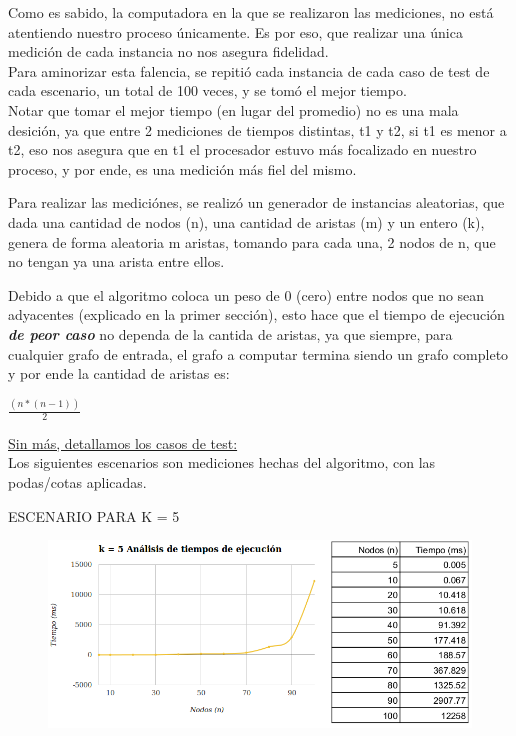 \documentclass[10pt,a4paper]{article}
\begin{document}
Como es sabido, la computadora en la que se realizaron las mediciones, no está atentiendo nuestro proceso únicamente. Es por eso, que realizar una única medición de cada instancia no nos asegura fidelidad.\\
\indent Para aminorizar esta falencia, se repitió cada instancia de cada caso de test de cada escenario, un total de 100 veces, y se tomó el mejor tiempo.\\
Notar que tomar el mejor tiempo (en lugar del promedio) no es una mala desición, ya que entre 2 mediciones de tiempos distintas, t1 y t2, si t1 es menor a t2, eso nos asegura que en t1 el procesador estuvo más focalizado en nuestro proceso, y por ende, es una medición más fiel del mismo.

Para realizar las mediciónes, se realizó un generador de instancias aleatorias, que dada una cantidad de nodos (n), una cantidad de aristas (m) y un entero (k), genera de forma aleatoria m aristas, tomando para cada una, 2 nodos de n, que no tengan ya una arista entre ellos.

Debido a que el algoritmo coloca un peso de 0 (cero) entre nodos que no sean adyacentes (explicado en la primer sección), esto hace que el tiempo de ejecución \textit{\textbf{de peor caso}} no dependa de la cantida de aristas, ya que siempre, para cualquier grafo de entrada, el grafo a computar termina siendo un grafo completo y por ende la cantidad de aristas es:

\begin{center}
\LARGE $\frac{(n * (n-1))}{2}$ \\
\end{center}


\underline{Sin más, detallamos los casos de test:}\\

Los siguientes escenarios son mediciones hechas del algoritmo, con las podas/cotas aplicadas.

\indent ESCENARIO PARA K = 5
	\begin{figure}[h]
		\begin{center}
		   \includegraphics[scale=0.70]{paraGraficar/k5.png}
		\end{center}	
	\end{figure}
\end{document}

